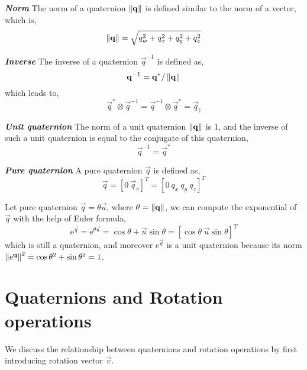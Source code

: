 \textbf{\textit{Norm}} The norm of a quaternion $\left\|\mathbf{q}\right\|$ is defined similar to the norm of a vector, which is,
\begin{equation}\label{q9}
	\left\|\mathbf{q}\right\| = \sqrt{q_w^2+q_x^2+q_y^2+q_z^2}
\end{equation}

\textbf{\textit{Inverse}} The inverse of a quaternion $\vec{q}^{-1}$ is defined as,
\begin{equation}\label{q10}
	\mathbf{q}^{-1} = \mathbf{q}^* / \left\|\mathbf{q}\right\|
\end{equation}
which leads to,
\begin{equation}\label{q11}
	\vec{q}^* \otimes \vec{q}^{-1} = \vec{q}^{-1} \otimes \vec{q}^*  = \vec{q}_{\mathbb{I}}
\end{equation}

\textbf{\textit{Unit quaternion}} The norm of a unit quaternion $\left\|\mathbf{q}\right\|$ is $1$, and the inverse of such a unit quaternion is equal to the conjugate of this quaternion,
\begin{equation}\label{q12}
	\vec{q}^{-1} = \vec{q}^*
\end{equation}

\textbf{\textit{Pure quaternion}} A pure quaternion $\vec{q}$ is defined as,
\begin{equation}\label{q13}
	\vec{q} = \left[0 \ \vec{q}_v \right]^T = \left[0 \ q_x \ q_y \ q_z \right]^T
\end{equation}

Let pure quaternion $\vec{q} = \theta\vec{u}$, where $\theta = \left\|\mathbf{q}\right\|$, we can compute the exponential of $\vec{q}$ with the help of Euler formula,
\begin{equation}\label{q14}
	\mathrm{e}^{\vec{q}} = \mathrm{e}^{\theta\vec{u}} = \cos{\theta} + \vec{u}\sin{\theta} = \left[\cos{\theta} \ \vec{u}\sin{\theta} \right]^T
\end{equation}
which is still a quaternion, and moreover $\mathrm{e}^{\vec{q}}$ is a unit quaternion because its norm $\left\|\mathrm{e}^{\mathbf{q}}\right\|^2 = \cos{\theta}^2 + \sin{\theta}^2 = 1$.

\section{Quaternions and Rotation operations}
\label{sec:quat_and_rot}

We discuss the relationship between quaternions and rotation operations by first introducing rotation vector $\vec{v}$. 

